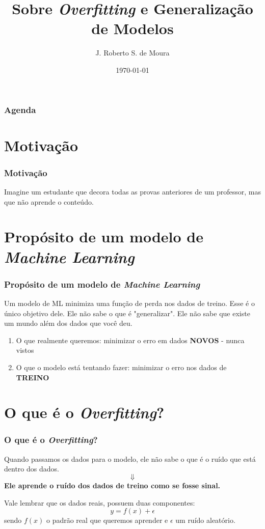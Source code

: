 \documentclass[12pt, aspectratio=169]{beamer}
\title{Sobre \textit{Overfitting} e Generalização de Modelos}
\author{J. Roberto S. de Moura}
\date{\today}
\begin{document}
\begin{frame}
  \titlepage
\end{frame}


\begin{frame}\frametitle{Agenda}
  \tableofcontents
\end{frame}

\section{Motivação}
\begin{frame}\frametitle{Motivação}
  Imagine um estudante que decora todas as provas anteriores de um professor,
  mas que não aprende o conteúdo.\\[1cm]
\centering{}
\end{frame}

\section{Propósito de um modelo de \textit{Machine Learning}}
\begin{frame}\frametitle{Propósito de um modelo de \textit{Machine Learning}}

  \begin{tcolorbox}[colback=gray!10, colframe=black!70, title=Problema Central]
  
    Um modelo de ML minimiza uma função de perda nos dados de treino.
    Esse é o único objetivo dele. Ele não sabe o que é "generalizar".
    Ele não sabe que existe um mundo além dos dados que você deu.

      \begin{enumerate}
        \item O que realmente queremos: minimizar o erro em dados \textbf{NOVOS} - nunca vistos
        \item O que o modelo está tentando fazer: minimizar o erro nos dados de \textbf{TREINO}
      \end{enumerate}

  \end{tcolorbox}

\end{frame}

\section{O que é o \textit{Overfitting}?}
\begin{frame}\frametitle{O que é o \textit{Overfitting}?}
Quando passamos os dados para o modelo, ele não sabe o que é o ruído que está dentro dos dados.
$$
\Downarrow
$$
\textbf{Ele aprende o ruído dos dados de treino como se fosse sinal.}

Vale lembrar que os dados reais, possuem duas componentes:
$$
  y = f(x) + \epsilon
$$
  sendo $f(x)$ o padrão real que queremos aprender e $\epsilon$ um ruído aleatório.

\end{frame}
\end{document}
